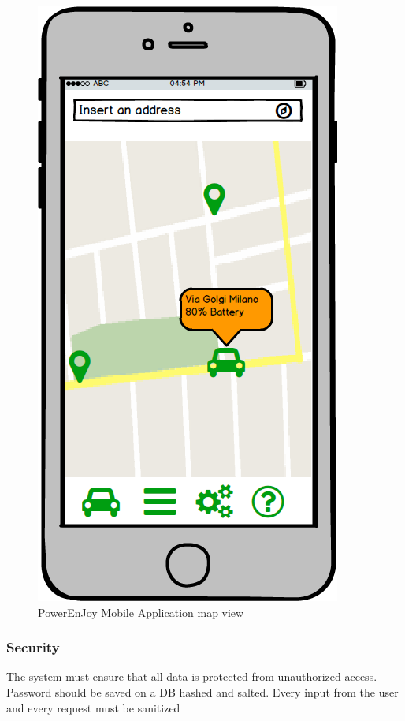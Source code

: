 \begin{itemize}
\begin{figure}[h]
	\centering
	\includegraphics[scale=0.4]{img/appmap}
	\caption{PowerEnJoy Mobile Application map view}
\end{figure}
\FloatBarrier

\subsubsection{Security}

The system must ensure that all data is protected from unauthorized
access. Password should be saved on a DB hashed and salted.
Every input from the user and every request must be sanitized 

\end{itemize}






